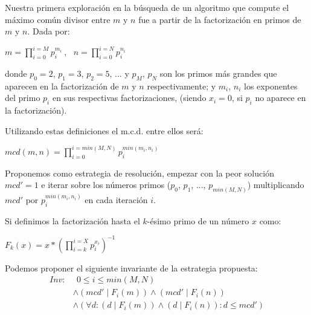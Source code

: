 \documentclass[12pt, a4paper, openany, fleqn]{book}
\begin{document}
    Nuestra primera exploración en la búsqueda de un algoritmo que compute el máximo común divisor entre $m$ y $n$ fue a partir de la factorización en primos de $m$ y $n$. Dada por:

    \begin{center}
        \begin{math}
            m = \prod_{i=0}^{i=M} p_{i}^{m_i}\ , \ \ \ n = \prod_{i=0}^{i=N} p_{i}^{n_i}
        \end{math}
    \end{center}

    donde $p_0=2$, $p_1= 3$, $p_2= 5$, ... y $p_{M}$, $p_{N}$ son los primos más grandes que aparecen en la factorización de $m$ y $n$ respectivamente; y $m_i$, $n_i$ los exponentes del primo $p_i$ en sus respectivas factorizaciones, (siendo $x_i=0$, si $p_i$ no aparece en la factorización).

    Utilizando estas definiciones el m.c.d. entre ellos será:

    \begin{center}
        \begin{math}
            mcd(m, n) = \prod_{i=0}^{i=min(M, N)} p_{i}^{min(m_i, n_i)}
        \end{math}
    \end{center}

    Proponemos como estrategia de resolución, empezar con la peor solución $mcd' = 1$ e iterar sobre los números primos ($p_0$, $p_1$, ..., $p_{min(M, N)}$) multiplicando $mcd'$ por $p_{i}^{min(m_{i}, n_{i})}$ en cada iteración $i$.

    Si definimos la factorización hasta el $k$-ésimo primo de un número $x$ como:
    \begin{center}
        \begin{math}
            F_k(x) = x * (\prod_{i=k}^{i=X} p_{i}^{x_i})^{-1}
        \end{math}
    \end{center}

    Podemos proponer el siguiente invariante de la estrategia propuesta:
    \begin{align*}
        Inv:&\ \  0 \leqslant i \leqslant min(M, N) \\
            &\land (mcd' \mathrel{|} F_i(m)) \land (mcd' \mathrel{|} F_i(n)) \\
            &\land (\forall d: (d \mathrel{|} F_i(m)) \land (d \mathrel{|} F_i(n)) : d \leq mcd') 
    \end{align*}
\end{document}
